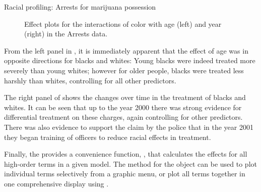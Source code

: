 \documentclass[11pt]{book}
\renewenvironment{knitrout}{\small\renewcommand{\baselinestretch}{.85}}{} %
\begin{document}
\begin{Example}[arrests]{Racial profiling: Arrests for marijuana possession}
\begin{knitrout}
\begin{figure}[!htbp]
\caption[Effect plots for the interactions of color with age (left) and year (right) in the Arrests data]{Effect plots for the interactions of color with age (left) and year (right) in the Arrests data.\label{fig:arrests-eff2}}
\end{figure}


\end{knitrout}
From the left panel in , it is immediately apparent that
the effect of age was in opposite directions for blacks and whites:
Young blacks were indeed treated more severely than young whites; however
for older people, blacks were treated less harshly than whites,
controlling for all other predictors.

The right panel of  shows the changes over time in
the treatment of blacks and whites.  It can be seen that up to the year 2000
there was strong evidence for differential treatment on these charges,
again controlling for other predictors.  There was also evidence to support
the claim by the police that in the year 2001 they began training of officers
to reduce racial effects in treatment.

Finally, the  provides a convenience function, , that
calculates the effects for all high-order terms in a given model. The  method
for the  object can be used to plot individual terms selectively from
a graphic menu, or plot all terms together in one comprehensive display using
.

\begin{knitrout}
\color{fgcolor}\begin{kframe}
\begin{alltt}
 \hlkwb{<-} 
                              \hlstd{=}\hlstd{(}\hlstd{=}\hlstd{(}\hlstd{,}\hlstd{,}\hlstd{)))}
     \hlstd{=}\hlstd{,} \hlstd{=}\hlstd{,} \hlstd{=}\hlstd{)}
\end{alltt}
\end{kframe}\begin{figure}[!htbp]



\end{figure}
\end{knitrout}
\end{Example}
\end{document}
